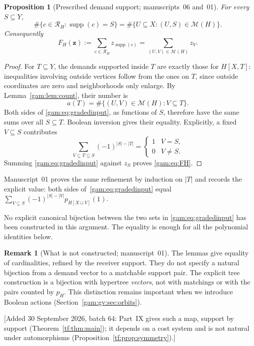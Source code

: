 \documentclass[11pt]{article}
\numberwithin{equation}{section}
\newtheorem{proposition}[theorem]{Proposition}
\theoremstyle{definition}
\newtheorem{remark}[theorem]{Remark}
\newcommand{\supp}{\operatorname{supp}}
\newcommand{\zv}{\mathbf z}
\begin{document}
\begin{proposition}[Prescribed demand support; manuscripts~06 and~01]\label{gam:prop:gradedinput}
For every $S\subseteq Y$,
\begin{equation}
 \#\{c\in\mathcal R_H:\supp(c)=S\}
  =\#\{U\subseteq X:(U,S)\in\mathcal M(H)\}.
 \label{gam:eq:gradedinput}
\end{equation}
Consequently
\begin{equation}
 F_H(\zv):=\sum_{c\in\mathcal R_H}z_{\supp(c)}
       =\sum_{(U,V)\in\mathcal M(H)}z_V.
 \label{gam:eq:FH}
\end{equation}
\end{proposition}
\begin{proof}
For $T\subseteq Y$, the demands supported inside $T$ are exactly those for
$H[X,T]$: inequalities involving outside vertices follow from the ones on
$T$, since outside coordinates are zero and neighborhoods only enlarge.
By Lemma~\ref{gam:lem:count}, their number is
\[
 a(T)=\#\{(U,V)\in\mathcal M(H):V\subseteq T\}.
\]
Both sides of \eqref{gam:eq:gradedinput}, as functions of $S$, therefore have
the same sums over all $S\subseteq T$. Boolean inversion gives their
equality. Explicitly, a fixed $V\subseteq S$ contributes
\[
 \sum_{V\subseteq T\subseteq S}(-1)^{|S|-|T|}
 =\begin{cases}1&V=S,\\0&V\ne S.\end{cases}
\]
Summing \eqref{gam:eq:gradedinput} against $z_S$ proves \eqref{gam:eq:FH}.
\end{proof}
Manuscript~01 proves the same refinement by induction on $|T|$ and records
the explicit value: both sides of~\eqref{gam:eq:gradedinput} equal
$\sum_{V\subseteq S}(-1)^{|S|-|V|}p_{H[X\sqcup V]}(1)$.

No explicit canonical bijection between the two sets in
\eqref{gam:eq:gradedinput} has been constructed in this argument. The
equality is enough for all the polynomial identities below.

\begin{remark}[What is not constructed; manuscript~01]\label{gam:gv:rem:notconstructed}
The lemmas give equality of cardinalities, refined by the receiver support.
They do not specify a natural bijection from a demand vector to a matchable
support pair. The explicit tree construction is a bijection with hypertree
\emph{vectors}, not with matchings or with the pairs counted by $p_H$.
This distinction remains important when we introduce Boolean actions
(Section~\ref{gam:gv:sec:orbits}).
\end{remark}
[Added 30 September 2026, batch 64: Part~IX gives such a map, support
by support (Theorem~\ref{tf:thm:main}); it depends on a cost system and is
not natural under automorphisms (Proposition~\ref{tf:prop:symmetry}).]
\end{document}
